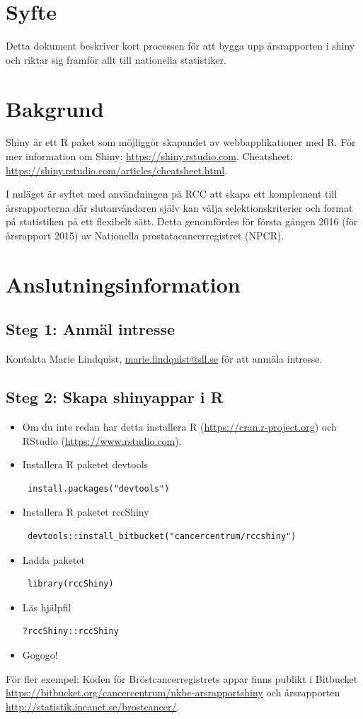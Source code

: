 \documentclass[12pt, a4paper,twoside]{report}
\begin{document}
\section{Syfte}
Detta dokument beskriver kort processen för att bygga upp årsrapporten i shiny och riktar sig framför allt till nationella statistiker.
\section{Bakgrund}
Shiny är ett R paket som möjliggör skapandet av webbapplikationer med R. För mer information om Shiny: \url{https://shiny.rstudio.com}.  Cheatsheet: \url{https://shiny.rstudio.com/articles/cheatsheet.html}.

I nuläget är syftet med användningen på RCC att skapa ett komplement till årsrapporterna där slutanvändaren själv kan välja selektionskriterier och format på statistiken på ett flexibelt sätt. Detta genomfördes för första gången 2016 (för årsrapport 2015) av Nationella prostatacancerregistret (NPCR).
\section{Anslutningsinformation}
\subsection{Steg 1: Anmäl intresse}
Kontakta Marie Lindquist, \href{mailto:marie.lindquist@sll.se}{marie.lindquist@sll.se} för att anmäla intresse. %
\subsection{Steg 2: Skapa shinyappar i R}
\begin{itemize}
\item Om du inte redan har detta installera R (\url{https://cran.r-project.org}) och RStudio (\url{https://www.rstudio.com}).
\item Installera R paketet devtools \begin{verbatim} install.packages("devtools")\end{verbatim}
\item Installera R paketet rccShiny \begin{verbatim} devtools::install_bitbucket("cancercentrum/rccshiny")\end{verbatim}
\item Ladda paketet \begin{verbatim} library(rccShiny)\end{verbatim}
\item Läs hjälpfil \begin{verbatim}?rccShiny::rccShiny\end{verbatim}
\item Gogogo!
\end{itemize}
För fler exempel: Koden för Bröstcancerregistrets appar finns publikt i Bitbucket \url{https://bitbucket.org/cancercentrum/nkbc-arsrapportshiny} och årsrapporten \url{http://statistik.incanet.se/brostcancer/}.
\end{document}
